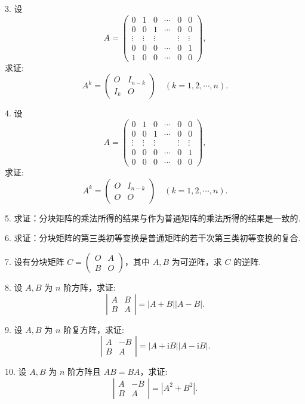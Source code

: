 \documentclass[UTF8,12pt,a4paper,fontset=fandol]{ctexart}
\begin{document}
3. 设
\[
A=\left(\begin{array}{cccccc}
0 & 1 & 0 & \cdots & 0 & 0\\
0 & 0 & 1 & \cdots & 0 & 0\\
\vdots & \vdots & \vdots & & \vdots & \vdots\\
0 & 0 & 0 & \cdots & 0 & 1\\
1 & 0 & 0 & \cdots & 0 & 0
\end{array}\right),
\]
求证:
\[
A^k=\left(\begin{array}{cc}
O & I_{n-k}\\
I_k & O
\end{array}\right)\quad (k=1,2,\cdots,n).
\]

4. 设
\[
A=\left(\begin{array}{cccccc}
0 & 1 & 0 & \cdots & 0 & 0\\
0 & 0 & 1 & \cdots & 0 & 0\\
\vdots & \vdots & \vdots & & \vdots & \vdots\\
0 & 0 & 0 & \cdots & 0 & 1\\
0 & 0 & 0 & \cdots & 0 & 0
\end{array}\right),
\]
求证:
\[
A^k=\left(\begin{array}{cc}
O & I_{n-k}\\
O & O
\end{array}\right)\quad (k=1,2,\cdots,n).
\]

5. 求证：分块矩阵的乘法所得的结果与作为普通矩阵的乘法所得的结果是一致的.

6. 求证：分块矩阵的第三类初等变换是普通矩阵的若干次第三类初等变换的复合.

7. 设有分块矩阵 $C=\left(\begin{array}{cc}O&A\\ B&O\end{array}\right)$，其中 $A,B$ 为可逆阵，求 $C$ 的逆阵.

8. 设 $A,B$ 为 $n$ 阶方阵，求证:
\[
\left|\begin{array}{cc}
A & B\\
B & A
\end{array}\right|=|A+B||A-B|.
\]

9. 设 $A,B$ 为 $n$ 阶复方阵，求证:
\[
\left|\begin{array}{cc}
A & -B\\
B & A
\end{array}\right|=|A+\mathrm{i}B||A-\mathrm{i}B|.
\]

10. 设 $A,B$ 为 $n$ 阶方阵且 $AB=BA$，求证:
\[
\left|\begin{array}{cc}
A & -B\\
B & A
\end{array}\right|=|A^2+B^2|.
\]
\end{document}
